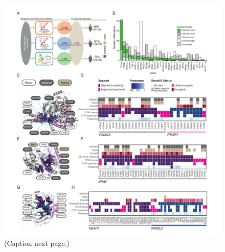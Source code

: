 \begin{figure}
  \centering
  \makeatletter
  \let\@currsize\normalsize
  \includegraphics[width=\linewidth]{figures/chapter7/driver_mutation_examples.pdf}
  \caption[Driver mutation discovery and validation]{(Caption next page.)}
  \label{fig:driver_mutation_examples}
\end{figure}
\addtocounter{figure}{-1}
